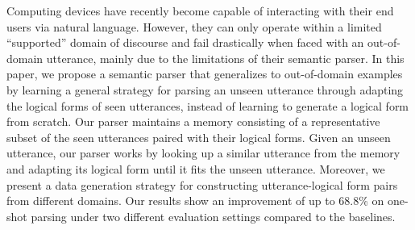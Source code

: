 Computing devices have recently become capable of interacting with their end users via natural language. However, they can only operate within a limited ``supported'' domain of discourse and fail drastically when faced with an out-of-domain utterance, mainly due to the limitations of their semantic parser. In this paper, we propose a semantic parser that generalizes to out-of-domain examples by learning a general strategy for parsing an unseen utterance through adapting the logical forms of seen utterances, instead of learning to generate a logical form from scratch. Our parser maintains a memory consisting of a representative subset of the seen utterances paired with their logical forms. Given an unseen utterance, our parser works by looking up a similar utterance from the memory and adapting its logical form until it fits the unseen utterance. Moreover, we present a data generation strategy for constructing utterance-logical form pairs from different domains. Our results show an improvement of up to 68.8\% on one-shot parsing under two different evaluation settings compared to the baselines.